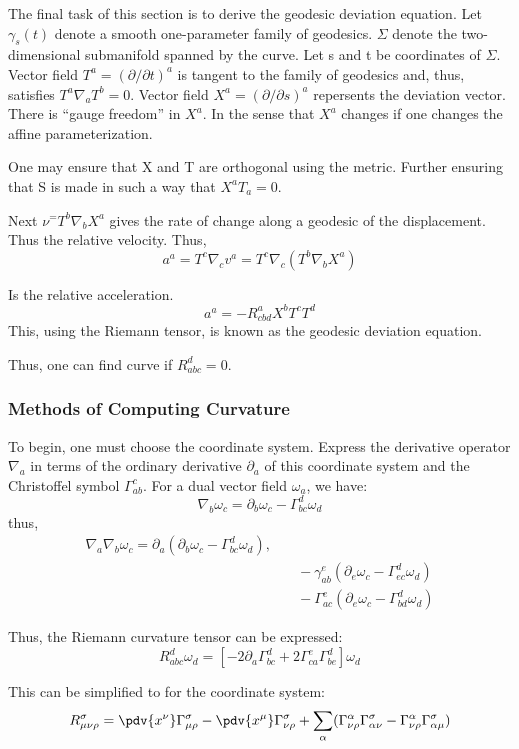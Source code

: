 The final task of this section is to derive the geodesic deviation equation. Let $\gamma_s(t)$ denote a smooth one-parameter family of geodesics. $\Sigma$ denote the two-dimensional submanifold spanned by the curve. Let s and t be coordinates of $\Sigma$. Vector field $T^a = (\partial / \partial t)^a$ is tangent to the family of geodesics and, thus, satisfies $T^a \nabla_a T^b = 0 $. Vector field $X^a=(\partial / \partial s)^a$ repersents the deviation vector. There is ``gauge freedom'' in $X^a$. In the sense that $X^a$ changes if one changes the affine parameterization.

One may ensure that X and T are orthogonal using the metric. Further ensuring that S is made in such a way that $X^a T_a =0$.

Next $\nu^ = T^b \nabla_b X^a$ gives the rate of change along a geodesic of the displacement. Thus the relative velocity. Thus,
\[
a^a=T^c \nabla_c v^a = T^c \nabla_c(T^b \nabla_b X^a)
\]

Is the relative acceleration.
\[
a^a = -R_{cbd}^a X^b T^c T^d
\]
This, using the Riemann tensor, is known as the geodesic deviation equation.

Thus, one can find curve if $R_{abc}^d = 0$.

\subsubsection{Methods of Computing Curvature}

To begin, one must choose the coordinate system. Express the derivative operator $\nabla_a$ in terms of the ordinary derivative $\partial_a$ of this coordinate system and the Christoffel symbol $\Gamma^c_{ab}$. For a dual vector field $\omega_a$, we have:
\[
\nabla_b \omega_c = \partial_b \omega_c - \Gamma^d_{bc} \omega_d
\]
thus,
\begin{align}
  \nabla_a \nabla_b \omega_c = \partial_a(\partial_b \omega_c - \Gamma^d_{bc} \omega_d), \\
  &\quad - \gamma^e_{ab}(\partial_e \omega_c - \Gamma^d_{ec}\omega_d) \\
  &\quad - \Gamma^e_{ac}(\partial_e \omega_c - \Gamma^d_{bd} \omega_d)
\end{align}

Thus, the Riemann curvature tensor can be expressed:
\[
R_{abc}^d \omega_d = [-2 \partial_{a}\Gamma^d_{bc} + 2 \Gamma^e_{ca} \Gamma^d_{be}] \omega_d
\]

This can be simplified to for the coordinate system:
\[
R_{\mu \nu \rho}^\sigma = \pdv{x^\nu} \Gamma^\sigma_{\mu \rho} - \pdv{x^\mu}\Gamma^\sigma_{\nu \rho} + \sum_\alpha (\Gamma^\alpha_{\nu \rho} \Gamma^\sigma_{\alpha \nu} - \Gamma^\alpha_{\nu \rho} \Gamma^\sigma_{\alpha \mu})
\]

